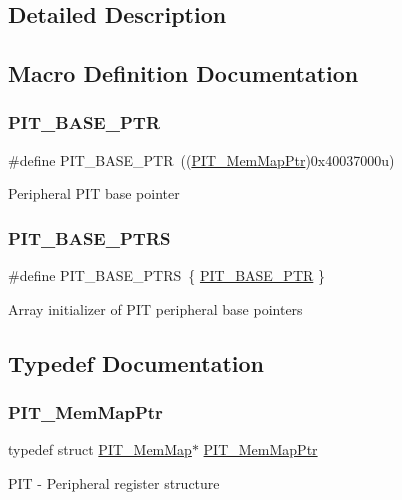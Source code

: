 \subsection{Detailed Description}


\subsection{Macro Definition Documentation}
\mbox{\label{group___p_i_t___peripheral_ga70be45f58402a8e6d2ce4df7b23aa41c}} 
\subsubsection{\texorpdfstring{P\+I\+T\+\_\+\+B\+A\+S\+E\+\_\+\+P\+TR}{PIT\_BASE\_PTR}}
{\footnotesize\ttfamily \#define P\+I\+T\+\_\+\+B\+A\+S\+E\+\_\+\+P\+TR~((\hyperlink{group___p_i_t___peripheral_ga4efe9d2676c775562cb282254af9a937}{P\+I\+T\+\_\+\+Mem\+Map\+Ptr})0x40037000u)}

Peripheral P\+IT base pointer \mbox{\label{group___p_i_t___peripheral_ga403e0ed71b80cfe3e085fe6b56b5eff0}} 
\subsubsection{\texorpdfstring{P\+I\+T\+\_\+\+B\+A\+S\+E\+\_\+\+P\+T\+RS}{PIT\_BASE\_PTRS}}
{\footnotesize\ttfamily \#define P\+I\+T\+\_\+\+B\+A\+S\+E\+\_\+\+P\+T\+RS~\{ \hyperlink{group___p_i_t___peripheral_ga70be45f58402a8e6d2ce4df7b23aa41c}{P\+I\+T\+\_\+\+B\+A\+S\+E\+\_\+\+P\+TR} \}}

Array initializer of P\+IT peripheral base pointers 

\subsection{Typedef Documentation}
\mbox{\label{group___p_i_t___peripheral_ga4efe9d2676c775562cb282254af9a937}} 
\subsubsection{\texorpdfstring{P\+I\+T\+\_\+\+Mem\+Map\+Ptr}{PIT\_MemMapPtr}}
{\footnotesize\ttfamily typedef struct \hyperlink{struct_p_i_t___mem_map}{P\+I\+T\+\_\+\+Mem\+Map}$\ast$ \hyperlink{group___p_i_t___peripheral_ga4efe9d2676c775562cb282254af9a937}{P\+I\+T\+\_\+\+Mem\+Map\+Ptr}}

P\+IT -\/ Peripheral register structure 